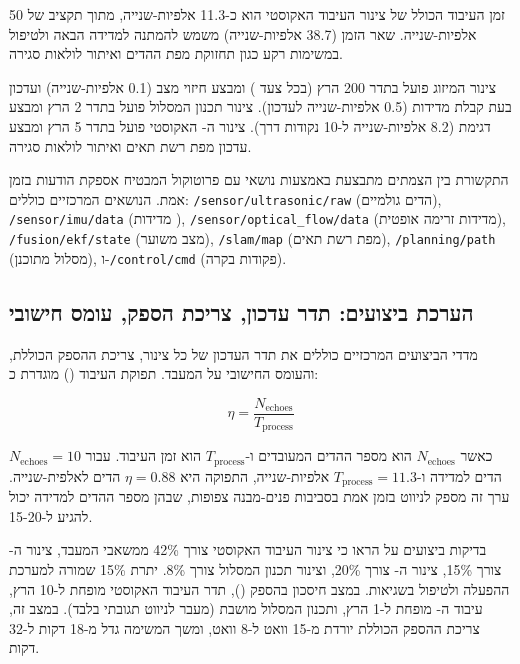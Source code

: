 זמן העיבוד הכולל של צינור העיבוד האקוסטי הוא כ-11.3 אלפיות-שנייה, מתוך תקציב של 50 אלפיות-שנייה. שאר הזמן (38.7 אלפיות-שנייה) משמש להמתנה למדידה הבאה ולטיפול במשימות רקע כגון תחזוקת מפת ההדים ואיתור לולאות סגירה. \cite{CrewAIDocs}

צינור המיזוג  פועל בתדר 200 הרץ (בכל צעד ) ומבצע חיזוי מצב (0.1 אלפיות-שנייה) ועדכון בעת קבלת מדידות (0.5 אלפיות-שנייה לעדכון). צינור תכנון המסלול פועל בתדר 2 הרץ ומבצע דגימת  (8.2 אלפיות-שנייה ל-10 נקודות דרך). צינור ה- האקוסטי פועל בתדר 5 הרץ ומבצע עדכון מפת רשת תאים ואיתור לולאות סגירה.

התקשורת בין הצמתים מתבצעת באמצעות נושאי  עם פרוטוקול  המבטיח אספקת הודעות בזמן אמת. הנושאים המרכזיים כוללים: \texttt{/sensor/ultrasonic/raw} (הדים גולמיים), \texttt{/sensor/imu/data} (מדידות ), \texttt{/sensor/optical_flow/data} (מדידות זרימה אופטית), \texttt{/fusion/ekf/state} (מצב משוער), \texttt{/slam/map} (מפת רשת תאים), \texttt{/planning/path} (מסלול מתוכנן), ו-\texttt{/control/cmd} (פקודות בקרה).

\subsection{הערכת ביצועים: תדר עדכון, צריכת הספק, עומס חישובי}
\label{sec:ch07_performance}

מדדי הביצועים המרכזיים כוללים את תדר העדכון של כל צינור, צריכת ההספק הכוללת, והעומס החישובי על המעבד. תפוקת העיבוד () מוגדרת כ:

\begin{equation}
\eta = \frac{N_{\text{echoes}}}{T_{\text{process}}}
\label{eq:ch07_throughput}
\end{equation}

כאשר $N_{\text{echoes}}$ הוא מספר ההדים המעובדים ו-$T_{\text{process}}$ הוא זמן העיבוד. עבור $N_{\text{echoes}} = 10$ הדים למדידה ו-$T_{\text{process}} = 11.3$ אלפיות-שנייה, התפוקה היא $\eta = 0.88$ הדים לאלפית-שנייה. ערך זה מספק לניווט בזמן אמת בסביבות פנים-מבנה צפופות, שבהן מספר ההדים למדידה יכול להגיע ל-15-20. \cite{CrewAIDocs}

בדיקות ביצועים על  הראו כי צינור העיבוד האקוסטי צורך 42\% ממשאבי המעבד, צינור ה- צורך 15\%, צינור ה- צורך 20\%, וצינור תכנון המסלול צורך 8\%. יתרת 15\% שמורה למערכת ההפעלה ולטיפול בשגיאות. במצב חיסכון בהספק (), תדר העיבוד האקוסטי מופחת ל-10 הרץ, עיבוד ה- מופחת ל-1 הרץ, ותכנון המסלול מושבת (מעבר לניווט תגובתי בלבד). במצב זה, צריכת ההספק הכוללת יורדת מ-15 וואט ל-8 וואט, ומשך המשימה גדל מ-18 דקות ל-32 דקות. \cite{CrewAIDocs}

